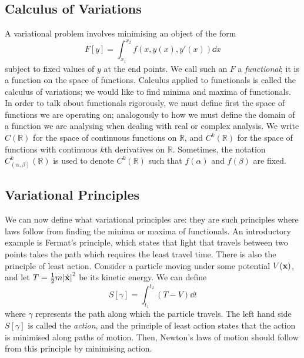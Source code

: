 \subsection{Calculus of Variations}
A variational problem involves minimising an object of the form
\[
	F[y] = \int_{x_1}^{x_2} f(x, y(x), y'(x)) \dd{x}
\]
subject to fixed values of \(y\) at the end points.
We call such an \(F\) a \textit{functional}; it is a function on the space of functions.
Calculus applied to functionals is called the calculus of variations; we would like to find minima and maxima of functionals.
In order to talk about functionals rigorously, we must define first the space of functions we are operating on; analogously to how we must define the domain of a function we are analysing when dealing with real or complex analysis.
We write \(C(\mathbb R)\) for the space of continuous functions on \(\mathbb R\), and \(C^k(\mathbb R)\) for the space of functions with continuous \(k\)th derivatives on \(\mathbb R\).
Sometimes, the notation \(C_{(\alpha, \beta)}^k(\mathbb R)\) is used to denote \(C^k(\mathbb R)\) such that \(f(\alpha)\) and \(f(\beta)\) are fixed.

\subsection{Variational Principles}
We can now define what variational principles are: they are such principles where laws follow from finding the minima or maxima of functionals.
An introductory example is Fermat's principle, which states that light that travels between two points takes the path which requires the least travel time.
There is also the principle of least action. Consider a particle moving under some potential \(V(\vb x)\), and let \(T = \frac{1}{2}m\abs{\dot {\vb x}}^2\) be its kinetic energy. We can define
\[ S[\gamma] = \int_{t_1}^{t_2} (T - V)\dd{t} \]
where \(\gamma\) represents the path along which the particle travels. The left hand side \(S[\gamma]\) is called the \textit{action}, and the principle of least action states that the action is minimised along paths of motion.
Then, Newton's laws of motion should follow from this principle by minimising action.
